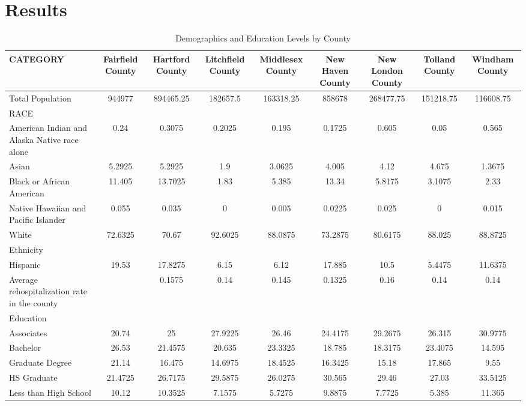 \documentclass[12pt]{article}
\begin{document}
\section{Results}\label{sec:resu}

\begin{table}[h]
    \centering
    \caption{Demographics and Education Levels by County} \label{tab:connecticut-counties}
    \begin{tabular}{l|cccccccc}
    \hline
    \textbf{CATEGORY} & \textbf{Fairfield County} & \textbf{Hartford County} & \textbf{Litchfield County} & \textbf{Middlesex County} & \textbf{New Haven County} & \textbf{New London County} & \textbf{Tolland County} & \textbf{Windham County} \\ \hline
    Total Population & 944977 & 894465.25 & 182657.5 & 163318.25 & 858678 & 268477.75 & 151218.75 & 116608.75 \\
    RACE &  &  &  &  &  &  &  &  \\
    American Indian and Alaska Native race alone & 0.24 & 0.3075 & 0.2025 & 0.195 & 0.1725 & 0.605 & 0.05 & 0.565 \\
    Asian & 5.2925 & 5.2925 & 1.9 & 3.0625 & 4.005 & 4.12 & 4.675 & 1.3675 \\
    Black or African American & 11.405 & 13.7025 & 1.83 & 5.385 & 13.34 & 5.8175 & 3.1075 & 2.33 \\
    Native Hawaiian and Pacific Islander & 0.055 & 0.035 & 0 & 0.005 & 0.0225 & 0.025 & 0 & 0.015 \\
    White & 72.6325 & 70.67 & 92.6025 & 88.0875 & 73.2875 & 80.6175 & 88.025 & 88.8725 \\
    Ethnicity &  &  &  &  &  &  &  &  \\
    Hispanic & 19.53 & 17.8275 & 6.15 & 6.12 & 17.885 & 10.5 & 5.4475 & 11.6375 \\
    Average rehospitalization rate in the county &  & 0.1575 & 0.14 & 0.145 & 0.1325 & 0.16 & 0.14 & 0.14 \\
    Education &  &  &  &  &  &  &  &  \\
    Associates & 20.74 & 25 & 27.9225 & 26.46 & 24.4175 & 29.2675 & 26.315 & 30.9775 \\
    Bachelor & 26.53 & 21.4575 & 20.635 & 23.3325 & 18.785 & 18.3175 & 23.4075 & 14.595 \\
    Graduate Degree & 21.14 & 16.475 & 14.6975 & 18.4525 & 16.3425 & 15.18 & 17.865 & 9.55 \\
    HS Graduate & 21.4725 & 26.7175 & 29.5875 & 26.0275 & 30.565 & 29.46 & 27.03 & 33.5125 \\
    Less than High School & 10.12 & 10.3525 & 7.1575 & 5.7275 & 9.8875 & 7.7725 & 5.385 & 11.365 \\ \hline
    \end{tabular}
    \end{table}    
\end{document}
